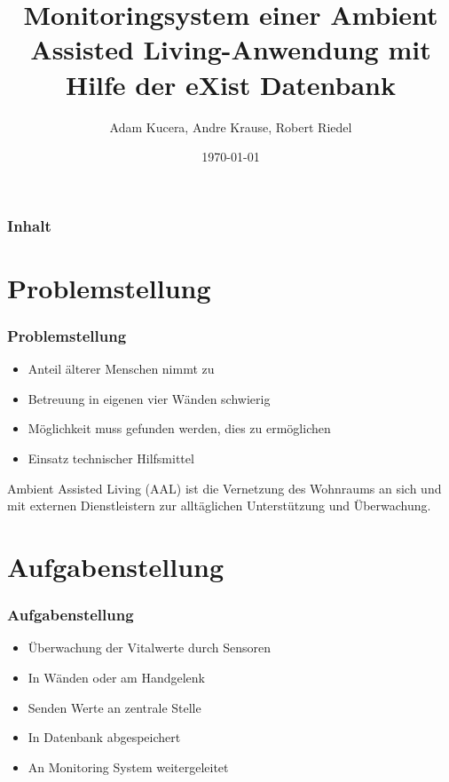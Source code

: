 \documentclass{beamer}
\title{Monitoringsystem einer Ambient Assisted Living-Anwendung mit Hilfe der eXist Datenbank}
\author{Adam Kucera, Andre Krause, Robert Riedel}
\date{\today}
\begin{document}
\maketitle
\begin{frame}
	\frametitle{Inhalt}
	\tableofcontents[%
 		hideothersubsections, %
	]
\end{frame}

\section{Problemstellung}
\begin{frame}
\frametitle{Problemstellung}
\begin{itemize}
	\item Anteil älterer Menschen nimmt zu
	\item Betreuung in eigenen vier Wänden schwierig
	\item Möglichkeit muss gefunden werden, dies zu ermöglichen
	\item Einsatz technischer Hilfsmittel
\end{itemize}
\begin{Definition}
Ambient Assisted Living (AAL) ist die Vernetzung des Wohnraums an sich und mit externen Dienstleistern zur alltäglichen Unterstützung und Überwachung.
\end{Definition}
\end{frame}

\section{Aufgabenstellung}
\begin{frame}
\frametitle{Aufgabenstellung}
\begin{itemize}
	\item Überwachung der Vitalwerte durch Sensoren
	\item In Wänden oder am Handgelenk
	\item Senden Werte an zentrale Stelle
	\item In Datenbank abgespeichert
	\item An Monitoring System weitergeleitet
\end{itemize}
\end{frame}
\end{document}
